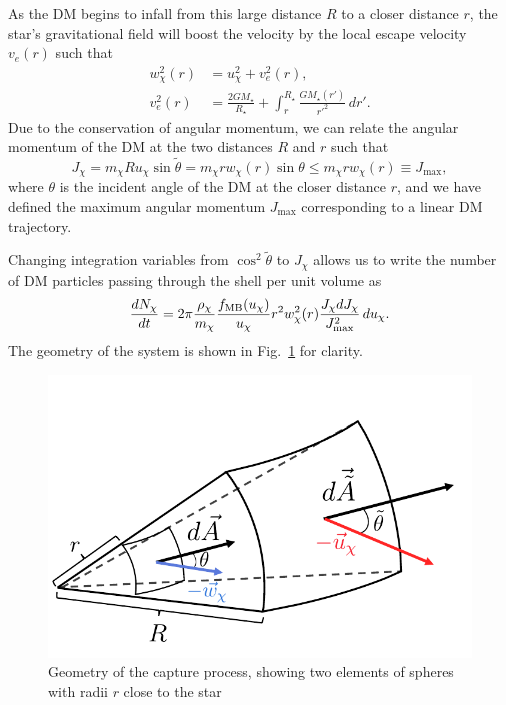 As the DM begins to infall from this large distance $R$ to a closer distance $r$, the star's gravitational field will boost the velocity by the local escape velocity $v_e(r)$ such that
\begin{align}
    w^2_\chi(r) &= u^2_\chi + v_e^2(r),\\
    v_e^2(r) & = \frac{2 G M_\star}{R_\star} + \int_r^{R_\star} \frac{G M_\star(r')}{r'^2}\,dr'.
\end{align}
Due to the conservation of angular momentum, we can relate the angular momentum of the DM at the two distances $R$ and $r$ such that
\begin{equation}
    J_\chi = m_\chi R u_\chi \sin \tilde\theta = m_\chi r w_\chi(r) \sin\theta \leq m_\chi r w_\chi(r) \equiv J_{\mathrm{max}},
\end{equation}
where $\theta$ is the incident angle of the DM at the closer distance $r$, and we have defined the maximum angular momentum $J_{\mathrm{max}}$ corresponding to a linear DM trajectory.

Changing integration variables from $\cos^2\tilde \theta$ to $J_\chi$ allows us to write the number of DM particles passing through the shell per unit volume as
\begin{equation}
    \frac{dN_\chi}{dt} = 2\pi \frac{\rho_\chi}{m_\chi} \frac{f_{\rm MB}(u_\chi)}{u_\chi} r^2 w_\chi^2(r) \frac{J_\chi dJ_\chi}{J^2_\mathrm{max}}\,du_\chi.\label{ch3:eq:shell_flux}
\end{equation}
The geometry of the system is shown in Fig.~\ref{ch3:fig:capturegeometry} for clarity.

\begin{figure}
    \centering
    \includegraphics{img/chapter_3/capture_geometry.pdf}
    \caption{Geometry of the capture process, showing two elements of spheres with radii $r$ close to the star  }
    \label{ch3:fig:capturegeometry}
\end{figure}

